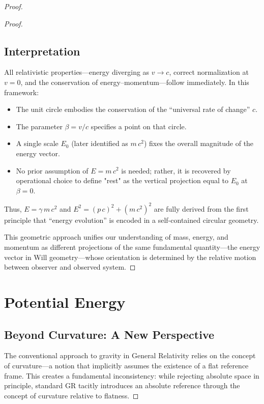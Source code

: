 \documentclass{article}
\begin{document}
\begin{proof}
\begin{proof}
\subsection*{Interpretation}

All relativistic properties—energy diverging as \(v \to c\), correct normalization at \(v=0\), and the conservation of energy–momentum—follow immediately.  In this framework:
\begin{itemize}
  \item The unit circle embodies the conservation of the “universal rate of change” \(c\).
  \item The parameter \(\beta = v/c\) specifies a point on that circle.
  \item A single scale \(E_0\) (later identified as \(m\,c^2\)) fixes the overall magnitude of the energy vector.
  \item No prior assumption of \(E = m\,c^2\) is needed; rather, it is recovered by operational choice to define "rest" as the vertical projection equal to \(E_0\) at \(\beta=0\).
\end{itemize}

Thus, \(E = \gamma\,m\,c^2\) and \(E^2 = (p\,c)^2 + (m\,c^2)^2\) are fully derived from the first principle that “energy evolution” is encoded in a self-contained circular geometry.

This geometric approach unifies our understanding of mass, energy, and momentum as different projections of the same fundamental quantity—the energy vector in Will geometry—whose orientation is determined by the relative motion between observer and observed system.
\end{proof}


\section{Potential Energy}


\subsection{Beyond Curvature: A New Perspective}

The conventional approach to gravity in General Relativity relies on the concept of curvature—a notion that implicitly assumes the existence of a flat reference frame. This creates a fundamental inconsistency: while rejecting absolute space in principle, standard GR tacitly introduces an absolute reference through the concept of curvature relative to flatness.


\end{proof}
\end{document}

